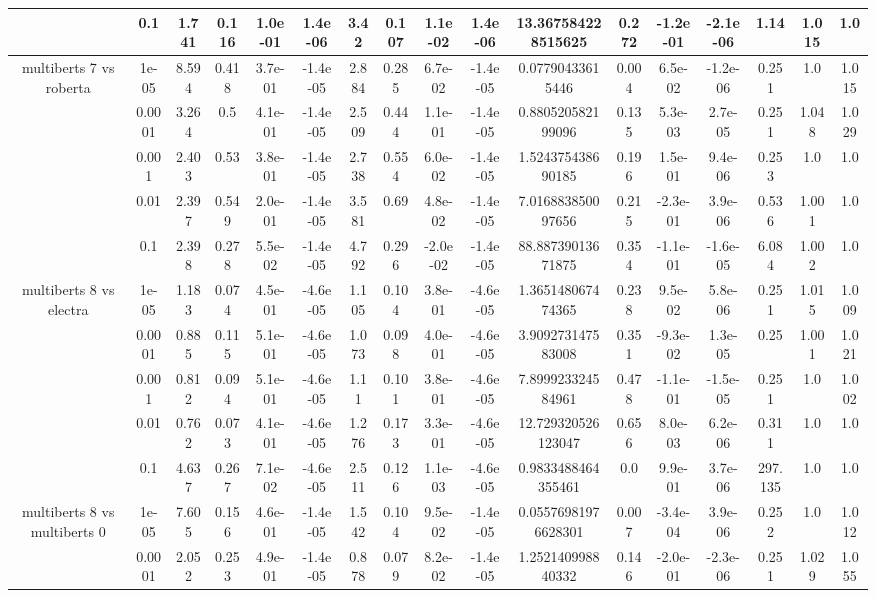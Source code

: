 \begin{tabular}{|c|c|c|c|c|c|c|c|c|c|c|c|c|c|c|c|c|}
 & 0.1 & 1.741 & 0.116 & 1.0e-01 & 1.4e-06 & 3.42 & 0.107 & 1.1e-02 & 1.4e-06 & 13.367584228515625 & 0.272 & -1.2e-01 & -2.1e-06 & 1.14 & 1.015 & 1.0 \\
\hline
\multirow{5}{*}{multiberts 7 vs roberta } & 1e-05 & 8.594 & 0.418 & 3.7e-01 & -1.4e-05 & 2.884 & 0.285 & 6.7e-02 & -1.4e-05 & 0.07790433615446 & 0.004 & 6.5e-02 & -1.2e-06 & 0.251 & 1.0 & 1.015 \\
 & 0.0001 & 3.264 & 0.5 & 4.1e-01 & -1.4e-05 & 2.509 & 0.444 & 1.1e-01 & -1.4e-05 & 0.880520582199096 & 0.135 & 5.3e-03 & 2.7e-05 & 0.251 & 1.048 & 1.029 \\
 & 0.001 & 2.403 & 0.53 & 3.8e-01 & -1.4e-05 & 2.738 & 0.554 & 6.0e-02 & -1.4e-05 & 1.524375438690185 & 0.196 & 1.5e-01 & 9.4e-06 & 0.253 & 1.0 & 1.0 \\
 & 0.01 & 2.397 & 0.549 & 2.0e-01 & -1.4e-05 & 3.581 & 0.69 & 4.8e-02 & -1.4e-05 & 7.016883850097656 & 0.215 & -2.3e-01 & 3.9e-06 & 0.536 & 1.001 & 1.0 \\
 & 0.1 & 2.398 & 0.278 & 5.5e-02 & -1.4e-05 & 4.792 & 0.296 & -2.0e-02 & -1.4e-05 & 88.88739013671875 & 0.354 & -1.1e-01 & -1.6e-05 & 6.084 & 1.002 & 1.0 \\
\hline
\multirow{5}{*}{multiberts 8 vs electra } & 1e-05 & 1.183 & 0.074 & 4.5e-01 & -4.6e-05 & 1.105 & 0.104 & 3.8e-01 & -4.6e-05 & 1.365148067474365 & 0.238 & 9.5e-02 & 5.8e-06 & 0.251 & 1.015 & 1.009 \\
 & 0.0001 & 0.885 & 0.115 & 5.1e-01 & -4.6e-05 & 1.073 & 0.098 & 4.0e-01 & -4.6e-05 & 3.909273147583008 & 0.351 & -9.3e-02 & 1.3e-05 & 0.25 & 1.001 & 1.021 \\
 & 0.001 & 0.812 & 0.094 & 5.1e-01 & -4.6e-05 & 1.11 & 0.101 & 3.8e-01 & -4.6e-05 & 7.899923324584961 & 0.478 & -1.1e-01 & -1.5e-05 & 0.251 & 1.0 & 1.002 \\
 & 0.01 & 0.762 & 0.073 & 4.1e-01 & -4.6e-05 & 1.276 & 0.173 & 3.3e-01 & -4.6e-05 & 12.729320526123047 & 0.656 & 8.0e-03 & 6.2e-06 & 0.311 & 1.0 & 1.0 \\
 & 0.1 & 4.637 & 0.267 & 7.1e-02 & -4.6e-05 & 2.511 & 0.126 & 1.1e-03 & -4.6e-05 & 0.9833488464355461 & 0.0 & 9.9e-01 & 3.7e-06 & 297.135 & 1.0 & 1.0 \\
\hline
\multirow{5}{*}{multiberts 8 vs multiberts 0} & 1e-05 & 7.605 & 0.156 & 4.6e-01 & -1.4e-05 & 1.542 & 0.104 & 9.5e-02 & -1.4e-05 & 0.05576981976628301 & 0.007 & -3.4e-04 & 3.9e-06 & 0.252 & 1.0 & 1.012 \\
 & 0.0001 & 2.052 & 0.253 & 4.9e-01 & -1.4e-05 & 0.878 & 0.079 & 8.2e-02 & -1.4e-05 & 1.252140998840332 & 0.146 & -2.0e-01 & -2.3e-06 & 0.251 & 1.029 & 1.055 \\

\end{tabular}
